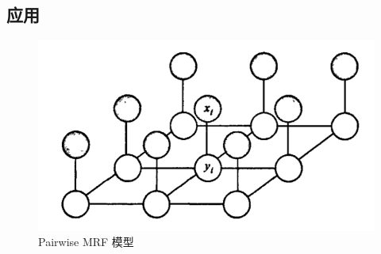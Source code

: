 \subsection*{应用}

\begin{frame}

	\begin{figure}[htbp]
		\centering
		\includegraphics[scale=0.6]{pic/1-4.png}
		\caption{Pairwise MRF 模型}
		\label{1-004}
	\end{figure}

\end{frame}









